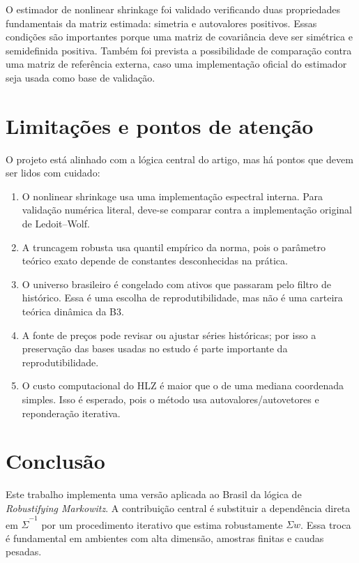 \documentclass[12pt,a4paper]{article}
\newcommand{\Sigmahat}{\widehat{\Sigma}}
\begin{document}
O estimador de nonlinear shrinkage foi validado verificando duas propriedades fundamentais da
matriz estimada: simetria e autovalores positivos. Essas condições são importantes porque uma
matriz de covariância deve ser simétrica e semidefinida positiva. Também foi prevista a
possibilidade de comparação contra uma matriz de referência externa, caso uma implementação
oficial do estimador seja usada como base de validação.

\section{Limitações e pontos de atenção}

O projeto está alinhado com a lógica central do artigo, mas há pontos que devem ser lidos
com cuidado:

\begin{enumerate}[leftmargin=*]
  \item O nonlinear shrinkage usa uma implementação espectral interna. Para validação numérica
  literal, deve-se comparar contra a implementação original de Ledoit--Wolf.
  \item A truncagem robusta usa quantil empírico da norma, pois o parâmetro teórico exato depende
  de constantes desconhecidas na prática.
  \item O universo brasileiro é congelado com ativos que passaram pelo filtro de histórico. Essa é
  uma escolha de reprodutibilidade, mas não é uma carteira teórica dinâmica da B3.
  \item A fonte de preços pode revisar ou ajustar séries históricas; por isso a preservação das
  bases usadas no estudo é parte importante da reprodutibilidade.
  \item O custo computacional do HLZ é maior que o de uma mediana coordenada simples. Isso é
  esperado, pois o método usa autovalores/autovetores e reponderação iterativa.
\end{enumerate}

\section{Conclusão}

Este trabalho implementa uma versão aplicada ao Brasil da lógica de \emph{Robustifying
Markowitz}. A contribuição central é substituir a dependência direta em $\Sigmahat^{-1}$ por
um procedimento iterativo que estima robustamente $\Sigma w$. Essa troca é fundamental em
ambientes com alta dimensão, amostras finitas e caudas pesadas.
\end{document}
